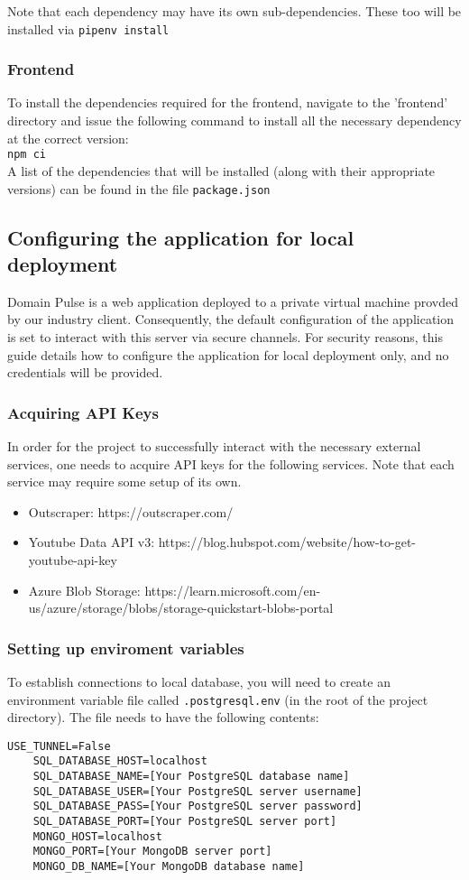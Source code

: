 \documentclass[12pt]{article}
\begin{document}
Note that each dependency may have its own sub-dependencies. These too will be installed via \texttt{pipenv install}

\subsubsection{Frontend}
To install the dependencies required for the frontend, navigate to the 'frontend' directory and issue the following command to install
all the necessary dependency at the correct version: \\
\texttt{npm ci}\\
A list of the dependencies that will be installed (along with their appropriate versions) can be found in the file \texttt{package.json}


\subsection{Configuring the application for local deployment}
Domain Pulse is a web application deployed to a private virtual machine provded by our industry client. Consequently, the default
configuration of the application is set to interact with this server via secure channels. For security reasons, this guide details how to configure
the application for local deployment only, and no credentials will be provided.

\subsubsection{Acquiring API Keys}
In order for the project to successfully interact with the necessary external services, one needs to acquire API keys for the following services.
Note that each service may require some setup of its own.
\begin{itemize}
    \item Outscraper: https://outscraper.com/
    \item Youtube Data API v3: https://blog.hubspot.com/website/how-to-get-youtube-api-key
    \item Azure Blob Storage: https://learn.microsoft.com/en-us/azure/storage/blobs/storage-quickstart-blobs-portal
\end{itemize}


\subsubsection{Setting up enviroment variables}
To establish connections to local database, you will need to create an environment variable file called \texttt{.postgresql.env} (in the root of the project directory). The file
needs to have the following contents:
\begin{lstlisting}[basicstyle=\ttfamily]
    USE_TUNNEL=False
    SQL_DATABASE_HOST=localhost
    SQL_DATABASE_NAME=[Your PostgreSQL database name]
    SQL_DATABASE_USER=[Your PostgreSQL server username]
    SQL_DATABASE_PASS=[Your PostgreSQL server password]
    SQL_DATABASE_PORT=[Your PostgreSQL server port]
    MONGO_HOST=localhost
    MONGO_PORT=[Your MongoDB server port]
    MONGO_DB_NAME=[Your MongoDB database name]
\end{lstlisting}
\end{document}
